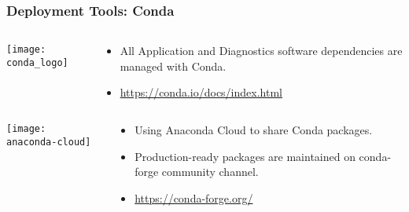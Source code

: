 \documentclass{beamer}
\begin{document}
\begin{frame}
\frametitle<presentation>{Deployment Tools: Conda}

  \begin{columns}[c]
    \begin{column}{.2\textwidth}
      \texttt{[image: conda\_logo]}
    \end{column}
    \begin{column}{.8\textwidth}
      \begin{itemize}
        \item All Application and Diagnostics software dependencies are managed with Conda.
        \item \footnotesize{\url{https://conda.io/docs/index.html}}
      \end{itemize}
    \end{column}
  \end{columns}
  \vrule
  \begin{columns}[c]
    \begin{column}{.2\textwidth}
      \texttt{[image: anaconda-cloud]}
    \end{column}
    \begin{column}{.8\textwidth}
      \begin{itemize}
        \item Using Anaconda Cloud to share Conda packages.
        \item Production-ready packages are maintained on conda-forge community channel.
        \item \footnotesize{\url{https://conda-forge.org/}}
      \end{itemize}
    \end{column}
  \end{columns}

\end{frame}
\end{document}
